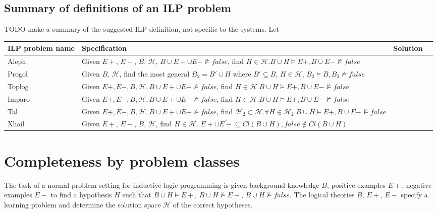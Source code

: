\subsection{Summary of definitions of an ILP problem}
TODO make a summary of the suggested ILP definition, not specific to the systems.
Let 
\begin{center}
    \begin{tabular}{ | l | p{15cm} | l | p{5cm} |}
    \hline
	ILP problem name & Specification & Solution\\ \hline
    Aleph & Given $E+$, $E-$, $B$, $\mathcal{H}$, $B \cup E+ \cup E- \not\models false$, find $H \in \mathcal{H}. B \cup H \models E+, B \cup E- \not\models false$\\ \hline
    Progol & Given $B$, $\mathcal{H}$, find the most general $B_2 = B' \cup H$ where $B' \subseteq B$, $H \in \mathcal{H}$, $B_2 \models B, B_2 \not\models false$\\ \hline
    Toplog & Given $E+, E-, B, \mathcal{H}, B \cup E+ \cup E- \not\models false$, find $H \in \mathcal{H}. B \cup H \models E+, B \cup E- \not\models false$ \\ \hline
    Imparo & Given $E+, E-, B, \mathcal{H}, B \cup E+ \cup E- \not\models false$, find $H \in \mathcal{H}. B \cup H \models E+, B \cup E- \not\models false$ \\ \hline
    Tal & Given $E+, E-, B, \mathcal{H}, B \cup E+ \cup E- \not\models false$, find $\mathcal{H}_2 \subset \mathcal{H}. \forall H \in \mathcal{H}_2. B \cup H \models E+, B \cup E- \not\models false$ \\ \hline
    Xhail & Given $E+$, $E-$, $B$, $\mathcal{H}$, find $H \in \mathcal{H}$. $E+ \cup \overline{E-} \subseteq Cl(B \cup H), false \not\in Cl(B \cup H)$\\ \hline
    \hline
    \end{tabular}
\end{center}

\section{Completeness by problem classes}
The task of a normal problem setting for inductive logic programming is given background knowledge $B$, positive examples $E+$, negative examples $E-$ to find a hypothesis $H$ such that $B \cup H \models E+$,
$B \cup H \not\models E-$,
$B \cup H \not\models false$.
The logical theories $B$, $E+$, $E-$ specify a learning problem and determine the solution space $\mathcal{H}$ of the correct hypotheses.

